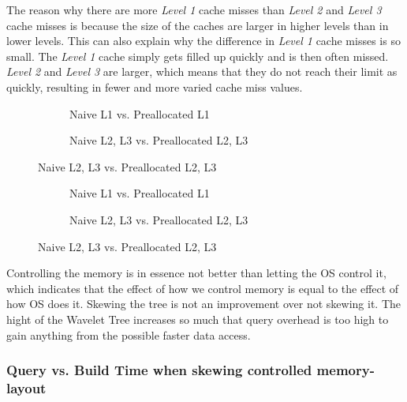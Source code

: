 The reason why there are more \textit{Level 1} cache misses than \textit{Level 2} and \textit{Level 3} cache misses is because the size of the caches are larger in higher levels than in lower levels. 
This can also explain why the difference in \textit{Level 1} cache misses is so small. 
The \textit{Level 1} cache simply gets filled up quickly and is then often missed. \textit{Level 2} and \textit{Level 3} are larger, which means that they do not reach their limit as quickly, resulting in fewer and more varied cache miss values.

\begin{figure}
\caption{Rank Cache Misses on Wavelet Tree with increasing skew}
\label{fig:NaivePreallocatedRankSkewCacheMisses}
\centering
\begin{subfigure}{\textwidth}
	\caption{Naive L1 vs. Preallocated L1}
	\label{fig:L1NaivePreallocatedRankSkewCacheMisses}
	
	\vspace*{5 mm}
\end{subfigure}
\begin{subfigure}{\textwidth}
	\caption{Naive L2, L3 vs. Preallocated L2, L3}
	\label{fig:L2L3NaivePreallocatedRankSkewCacheMisses}
 	
\end{subfigure}
\end{figure}

\begin{figure}
\caption{Select Cache Misses on Wavelet Tree with increasing skew}
\label{fig:NaivePreallocatedSelectSkewCacheMisses}
\centering
\begin{subfigure}{\textwidth}
	\caption{Naive L1 vs. Preallocated L1}
	\label{fig:L1NaivePreallocatedSelectSkewCacheMisses}
	
	\vspace*{5 mm}
\end{subfigure}
\begin{subfigure}{\textwidth}
	\caption{Naive L2, L3 vs. Preallocated L2, L3}
	\label{fig:L2L3NaivePreallocatedSelectSkewCacheMisses}
 	
\end{subfigure}
\end{figure}

Controlling the memory is in essence not better than letting the OS control it, which indicates that the effect of how we control memory is equal to the effect of how OS does it.
Skewing the tree is not an improvement over not skewing it. 
The hight of the Wavelet Tree increases so much that query overhead is too high to gain anything from the possible faster data access.


\subsubsection{Query vs. Build Time when skewing controlled memory-layout}





